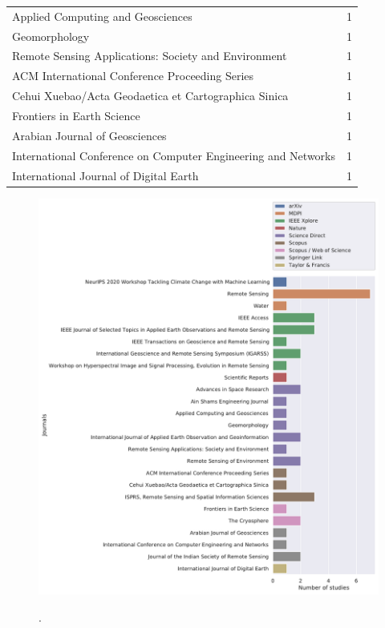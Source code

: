 \documentclass{article}
\begin{document}
\begin{table}[H]
\begin{tabularx}{\textwidth}{Xc}
        Applied Computing and Geosciences                                                  & 1 \\
        Geomorphology                                                                      & 1 \\
        Remote Sensing Applications: Society and Environment                               & 1 \\
        ACM International Conference Proceeding Series                                     & 1 \\
        Cehui Xuebao/Acta Geodaetica et Cartographica Sinica                               & 1 \\
        Frontiers in Earth Science                                                         & 1 \\
        Arabian Journal of Geosciences                                                     & 1 \\
        International Conference on Computer Engineering and Networks                      & 1 \\
        International Journal of Digital Earth                                             & 1 \\ \hline
    \end{tabularx}
\end{table}

\begin{figure}[H]
    \centering
    \includegraphics[width=1\textwidth]{images/fr_publisher_journal.pdf}
    \label{fig:frog}
    \caption{.}
\end{figure}
\end{document}

